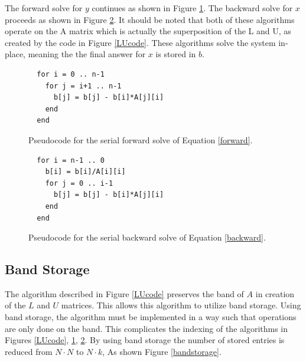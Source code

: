 \documentclass[12pt]{article}
\begin{document}
The forward solve for $y$ continues as shown in Figure \ref{forwardcode}. The
backward solve for $x$ proceeds as shown in Figure \ref{backwardcode}. It
should be noted that both of these algorithms operate on the A matrix which is
actually the superposition of the L and U, as created by the code in Figure \ref{LUcode}.
These algorithms solve the system in-place, meaning the the final answer for $x$ is stored in $b$.

\begin{figure}[H]
\caption{Pseudocode for the serial forward solve of Equation \ref{forward}.}
\label{forwardcode}
\begin{lstlisting}
  for i = 0 .. n-1
    for j = i+1 .. n-1
      b[j] = b[j] - b[i]*A[j][i]
    end
  end
\end{lstlisting}
\end{figure}

\begin{figure}[H]
\caption{Pseudocode for the serial backward solve of Equation \ref{backward}.}
\label{backwardcode}
\begin{lstlisting}
  for i = n-1 .. 0
    b[i] = b[i]/A[i][i]
    for j = 0 .. i-1
      b[j] = b[j] - b[i]*A[j][i]
    end
  end
\end{lstlisting}
\end{figure}

\subsection{Band Storage}
\label{band}

The algorithm described in Figure \ref{LUcode} preserves the band of $A$ in
creation of the $L$ and $U$ matrices. This allows this algorithm to utilize
band storage. Using band storage, the algorithm must be implemented in a way
such that operations are only done on the band. This complicates the indexing
of the algorithms in Figures \ref{LUcode}, \ref{forwardcode},
\ref{backwardcode}.  By using band storage the number of stored entries is
reduced from $N \cdot N$ to $N \cdot k$, As shown Figure \ref{bandstorage}.
\end{document}
